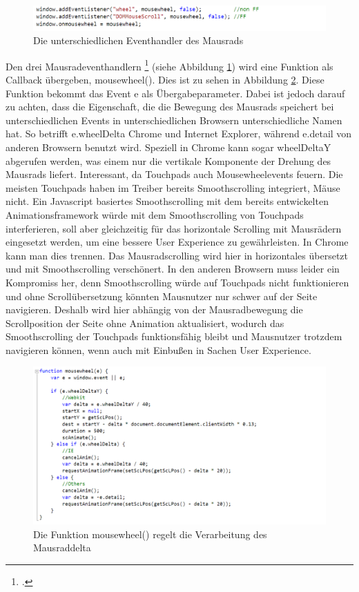 \begin{figure} [h]
\includegraphics[width=\textwidth]{./img/js_mousehandler.png}
\caption{Die unterschiedlichen Eventhandler des Mausrads}
\label{js_mousehandler}
\end{figure}

Den drei Mausradeventhandlern  \footcite[vgl.][]{jsMousewheel} (siehe Abbildung \ref{js_mousehandler}) wird eine Funktion als Callback übergeben, mousewheel(). Dies ist zu sehen in Abbildung \ref{js_mousewheel}. Diese Funktion bekommt das Event e als Übergabeparameter. Dabei ist jedoch darauf zu achten, dass die Eigenschaft, die die Bewegung des Mausrads speichert bei unterschiedlichen Events in unterschiedlichen Browsern unterschiedliche Namen hat. So betrifft e.wheelDelta Chrome und Internet Explorer, während e.detail von anderen Browsern benutzt wird. Speziell in Chrome kann sogar wheelDeltaY abgerufen werden, was einem nur die vertikale Komponente der Drehung des Mausrads liefert. Interessant, da Touchpads auch Mousewheelevents feuern. Die meisten Touchpads haben im Treiber bereits Smoothscrolling integriert, Mäuse nicht. Ein Javascript basiertes Smoothscrolling mit dem bereits entwickelten Animationsframework würde mit dem Smoothscrolling von Touchpads interferieren, soll aber gleichzeitig für das horizontale Scrolling mit Mausrädern eingesetzt werden, um eine bessere User Experience zu gewährleisten. In Chrome kann man dies trennen. Das Mausradscrolling wird hier in horizontales übersetzt und mit Smoothscrolling verschönert. In den anderen Browsern muss leider ein Kompromiss her, denn Smoothscrolling würde auf Touchpads nicht funktionieren und ohne Scrollübersetzung könnten Mausnutzer nur schwer auf der Seite navigieren. Deshalb wird hier abhängig von der Mausradbewegung die Scrollposition der Seite ohne Animation aktualisiert, wodurch das Smoothscrolling der Touchpads funktionsfähig bleibt und Mausnutzer trotzdem navigieren können, wenn auch mit Einbußen in Sachen User Experience.

\begin{figure} [h]
\includegraphics[width=\textwidth]{./img/js_mousewheel.png}
\caption{Die Funktion mousewheel() regelt die Verarbeitung des Mausraddelta}
\label{js_mousewheel}
\end{figure}

